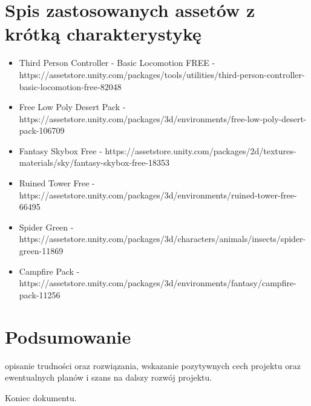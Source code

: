 \documentclass[10pt,a4paper]{article}
\begin{document}
\clearpage
\section{Spis zastosowanych assetów z krótką charakterystykę}
\begin{itemize}
  \item Third Person Controller - Basic Locomotion FREE - https://assetstore.unity.com/packages/tools/utilities/third-person-controller-basic-locomotion-free-82048
  \item Free Low Poly Desert Pack - https://assetstore.unity.com/packages/3d/environments/free-low-poly-desert-pack-106709
  \item Fantasy Skybox Free - https://assetstore.unity.com/packages/2d/textures-materials/sky/fantasy-skybox-free-18353
  \item Ruined Tower Free - https://assetstore.unity.com/packages/3d/environments/ruined-tower-free-66495
  \item Spider Green - https://assetstore.unity.com/packages/3d/characters/animals/insects/spider-green-11869
  \item Campfire Pack - https://assetstore.unity.com/packages/3d/environments/fantasy/campfire-pack-11256
\end{itemize}

\clearpage
\section{Podsumowanie}
opisanie trudności oraz rozwiązania, wskazanie pozytywnych cech projektu oraz ewentualnych planów i szans na dalszy rozwój projektu.


\noindent\makebox[\linewidth]{\rule{0.6\paperwidth}{0.4pt}}
\begin{center}
	Koniec dokumentu.
\end{center}
\end{document}
